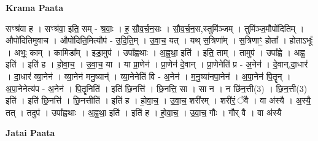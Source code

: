 \documentclass[17pt]{extarticle}
\begin{document}
\textbf{Krama Paata} \newline

सꣳश्र॑वा ह । सꣳश्र॑वा॒ इति॒ सम् - श्र॒वाः॒ । ह॒ सौ॒व॒र्च॒न॒सः । सौ॒व॒र्च॒न॒स,स्तुमि॑ञ्जम् । तुमि॑ञ्ज॒मौपो॑दितिम् । औपो॑दितिमुवाच । औपो॑दिति॒मित्यौप॑ - उ॒दि॒ति॒म् । उ॒वा॒च॒ यत् । यथ् स॒त्रिणा᳚म् । स॒त्रिणाꣳ॒॒ होता᳚ । होताऽभूः᳚ । अभूः॒ काम् । कामिडा᳚म् । इडा॒मुप॑ । उपा᳚ह्वथाः । अ॒ह्व॒था॒ इति॑ । इति॒ ताम् । तामुप॑ । उपा᳚ह्वे । अह्व॒ इति॑ । इति॑ ह । हो॒वा॒च॒ । उ॒वा॒च॒ या । या प्रा॒णेन॑ । प्रा॒णेन॑ दे॒वान् । प्रा॒णेनेति॑ प्र - अ॒नेन॑ । दे॒वान्,दा॒धार॑ । दा॒धार॑ व्या॒नेन॑ । व्या॒नेन॑ मनु॒ष्यान्॑ । व्या॒नेनेति॑ वि - अ॒नेन॑ । म॒नु॒ष्या॑नपा॒नेन॑ । अ॒पा॒नेन॑ पि॒तॄन् । अ॒पा॒नेनेत्य॑प - अ॒नेन॑ । पि॒तॄनिति॑ । इति॑ छि॒नत्ति॑ । छि॒नत्ति॒ सा । सा न । न छि॑न॒त्ती(3) । छि॒न॒त्ती(3) इति॑ । इति॑ छि॒नत्ति॑ । छि॒नत्तीति॑ । इति॑ ह । हो॒वा॒च॒ । उ॒वा॒च॒ शरी॑रम् । शरी॑रं॒ ॅवै । वा अ॑स्यै । अ॒स्यै॒ तत् । तदुप॑ । उपा᳚ह्वथाः । अ॒ह्व॒था॒ इति॑ । इति॑ ह । हो॒वा॒च॒ । उ॒वा॒च॒ गौः । गौर् वै । वा अ॑स्यै \newline

\textbf{Jatai Paata} \newline
\end{document}
